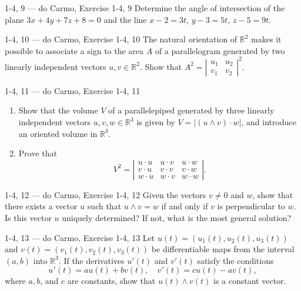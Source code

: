 \begin{exercise}{1-4, 9 — do Carmo, Exercise 1-4, 9}
Determine the angle of intersection of the plane $3x + 4y + 7z + 8 = 0$ and the line $x - 2 = 3t$, $y - 3 = 5t$, $z - 5 = 9t$.
\end{exercise}

\begin{exercise}{1-4, 10 — do Carmo, Exercise 1-4, 10}
The natural orientation of $\mathbb{R}^2$ makes it possible to associate a sign to the area $A$ of a parallelogram generated by two linearly independent vectors $u, v \in \mathbb{R}^2$. Show that $A^2 = \left| \begin{smallmatrix} u_1 & u_2 \\ v_1 & v_2 \end{smallmatrix} \right|^2$.
\end{exercise}

\begin{exercise}{1-4, 11 — do Carmo, Exercise 1-4, 11}
\begin{enumerate}
\item[a.] Show that the volume $V$ of a parallelepiped generated by three linearly independent vectors $u, v, w \in \mathbb{R}^3$ is given by $V = |(u \wedge v) \cdot w|$, and introduce an oriented volume in $\mathbb{R}^3$.
\item[b.] Prove that
\[
V^2 = \left| \begin{array}{ccc}
u \cdot u & u \cdot v & u \cdot w \\
v \cdot u & v \cdot v & v \cdot w \\
w \cdot u & w \cdot v & w \cdot w
\end{array} \right|.
\]
\end{enumerate}
\end{exercise}

\begin{exercise}{1-4, 12 — do Carmo, Exercise 1-4, 12}
Given the vectors $v \neq 0$ and $w$, show that there exists a vector $u$ such that $u \wedge v = w$ if and only if $v$ is perpendicular to $w$. Is this vector $u$ uniquely determined? If not, what is the most general solution?
\end{exercise}

\begin{exercise}{1-4, 13 — do Carmo, Exercise 1-4, 13}
Let $u(t) = (u_1(t), u_2(t), u_3(t))$ and $v(t) = (v_1(t), v_2(t), v_3(t))$ be differentiable maps from the interval $(a, b)$ into $\mathbb{R}^3$. If the derivatives $u'(t)$ and $v'(t)$ satisfy the conditions
\[
u'(t) = a u(t) + b v(t), \quad v'(t) = c u(t) - a v(t),
\]
where $a, b$, and $c$ are constants, show that $u(t) \wedge v(t)$ is a constant vector.
\end{exercise}

